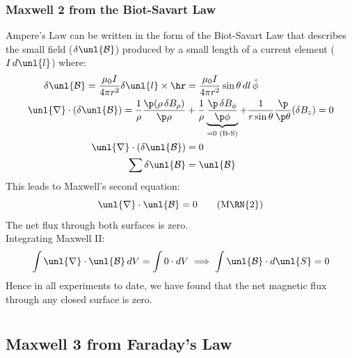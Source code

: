 \documentclass[a4paper, 11pt, normalem]{report}
\renewcommand\B{\mathcal{B}}
\newcommand\uB{\unl{\B}}
\renewcommand\del{\unl{\nabla}}
\begin{document}
\subsection{Maxwell 2 from the Biot-Savart Law}
Ampere's Law can be written in the form of the Biot-Savart Law that describes the small field ($\delta\uB$) produced by a small length of a current element ($I\,d\unl{l}$) where:
\begin{align}
    \delta \uB = \frac{\mu_0 I}{4\pi r^2}\delta\unl{l} \times \hr &= \frac{\mu_0 I}{4\pi r^2}\sin\theta\,dl\,\hat{\phi} \\
    \del \cdot (\delta\uB) = \frac{1}{\rho}\frac{\p(\rho\,\delta B_\rho)}{\p \rho} &+ \frac{1}{\rho}\underbrace{\frac{\p\, \delta B_\phi}{\p \phi}}_{= 0 \text{ (B-S)}} + \frac{1}{r\sin\theta} \frac{\p}{\p \theta}(\delta B_z) = 0 \\
    \del\cdot(\delta\uB) &= 0 \\
    \sum \delta\uB &= \uB
\end{align}
This leads to Maxwell's second equation:
\begin{equation}
    \del\cdot\uB = 0 \tag{M\RN{2}}
\end{equation}
The net flux through both surfaces is zero. \\
Integrating Maxwell \RN{2}:
\begin{equation}
    \int \del\cdot\uB\,dV = \int 0\cdot dV \implies \int \uB\cdot d\unl{S} = 0
\end{equation}
Hence in all experiments to date, we have found that the net magnetic flux through any closed surface is zero.

\chapter{}
\section{Maxwell 3 from Faraday's Law}
\end{document}
